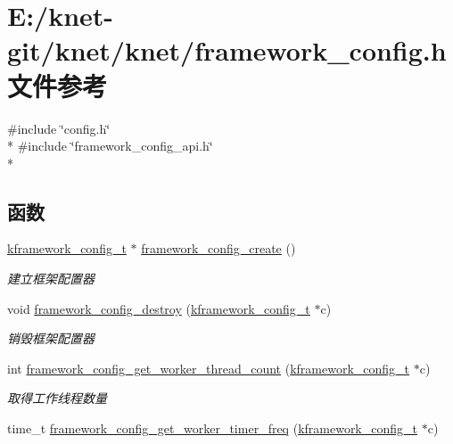 \hypertarget{a00059}{}\section{E\+:/knet-\/git/knet/knet/framework\+\_\+config.h 文件参考}
\label{a00059}
{\ttfamily \#include \char`\"{}config.\+h\char`\"{}}\\*
{\ttfamily \#include \char`\"{}framework\+\_\+config\+\_\+api.\+h\char`\"{}}\\*
\subsection*{函数}
\begin{DoxyCompactItemize}
\item 
\hyperlink{a00054_adeaf952e0f0887507ff836385bf54874_adeaf952e0f0887507ff836385bf54874}{kframework\+\_\+config\+\_\+t} $\ast$ \hyperlink{a00059_abb53b259903568ee8684e2979d5419cb_abb53b259903568ee8684e2979d5419cb}{framework\+\_\+config\+\_\+create} ()
\begin{DoxyCompactList}\small\item\em 建立框架配置器 \end{DoxyCompactList}\item 
void \hyperlink{a00059_a94f3ef660e9dd4e8c9b4a4f113c35833_a94f3ef660e9dd4e8c9b4a4f113c35833}{framework\+\_\+config\+\_\+destroy} (\hyperlink{a00054_adeaf952e0f0887507ff836385bf54874_adeaf952e0f0887507ff836385bf54874}{kframework\+\_\+config\+\_\+t} $\ast$c)
\begin{DoxyCompactList}\small\item\em 销毁框架配置器 \end{DoxyCompactList}\item 
int \hyperlink{a00059_aafb4c7a8913ed48592037da43edd8e39_aafb4c7a8913ed48592037da43edd8e39}{framework\+\_\+config\+\_\+get\+\_\+worker\+\_\+thread\+\_\+count} (\hyperlink{a00054_adeaf952e0f0887507ff836385bf54874_adeaf952e0f0887507ff836385bf54874}{kframework\+\_\+config\+\_\+t} $\ast$c)
\begin{DoxyCompactList}\small\item\em 取得工作线程数量 \end{DoxyCompactList}\item 
time\+\_\+t \hyperlink{a00059_ab0815a3aff5ee221ba2870899e25f045_ab0815a3aff5ee221ba2870899e25f045}{framework\+\_\+config\+\_\+get\+\_\+worker\+\_\+timer\+\_\+freq} (\hyperlink{a00054_adeaf952e0f0887507ff836385bf54874_adeaf952e0f0887507ff836385bf54874}{kframework\+\_\+config\+\_\+t} $\ast$c)

\end{DoxyCompactItemize}
